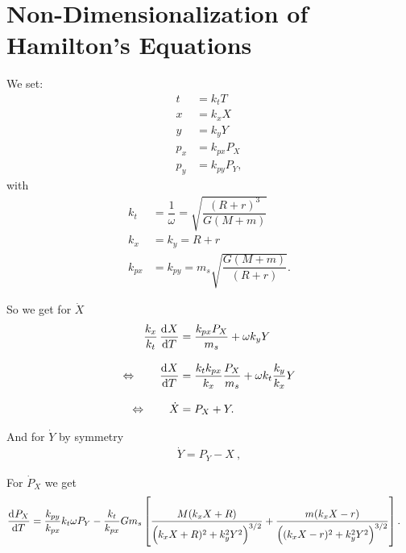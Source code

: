 \chapter{Non-Dimensionalization of Hamilton's Equations} \label{app:non-dimensionalization}
We set:
\begin{align}
t &= k_t T \\
x &= k_x X \\
y &= k_y Y \\
p_x &= k_{px} P_X \\
p_y &= k_{py} P_Y ,
\end{align}
with
\begin{align}
k_t &= \dfrac{1}{\omega} = \sqrt{\dfrac{(R+r)^3}{G(M+m)}} \\[0.5cm]
k_x &= k_y = R+r \\[0.5cm]
k_{px} &= k_{py} = m_s \sqrt{\dfrac{G(M+m)}{(R+r)}} .
\end{align}

So we get for $\dot{X}$
\begin{align}
\dfrac{k_x}{k_t} \dod{X}{T} &= \dfrac{k_{px} P_X}{m_s} + \omega k_y Y \\[0.3cm]
\Leftrightarrow \qquad \dod{X}{T} &= \dfrac{k_t k_{px}}{k_x} \dfrac{P_X}{m_s} + \omega k_t \dfrac{k_y}{k_x} Y \\[0.3cm]
\Leftrightarrow \qquad \dot{X} &= P_X + Y .
\end{align}

And for $\dot{Y}$ by symmetry
\begin{align}
\dot{Y} = P_Y - X \ ,
\end{align}

For $\dot{P}_X$ we get
\begin{align}
\dod{P_X}{T} &= \dfrac{k_{py}}{k_{px}} k_t\omega P_Y - \dfrac{k_t}{k_{px}}G m_s \left[\dfrac{M(k_x X + R)}{\left(k_x X + R)^2 + k_y^2 Y^2\right)^{3/2}} + \dfrac{m (k_x X - r)}{\left((k_x X - r)^2 + k_y^2 Y^2\right)^{3/2}} \right].
\end{align}

